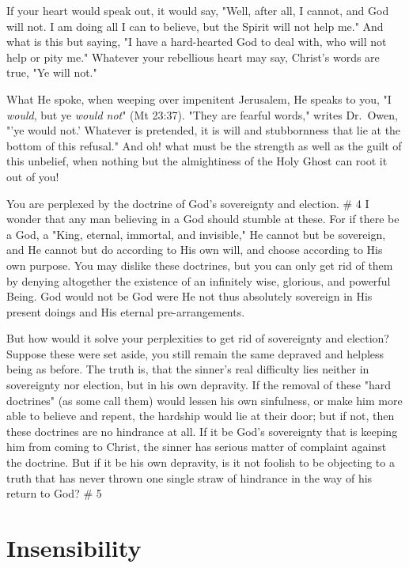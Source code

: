 \documentclass[
]{book}
\begin{document}
If your heart would speak out, it would say, "Well, after all, I cannot, and God will not. I am doing all I can to believe, but the Spirit will not help me." And what is this but saying, "I have a hard-hearted God to deal with, who will not help or pity me." Whatever your rebellious heart may say, Christ's words are true, "Ye will not."

What He spoke, when weeping over impenitent Jerusalem, He speaks to you, "I \emph{would}, but ye \emph{would not}" (Mt 23:37). "They are fearful words," writes Dr.~Owen, "'ye would not.' Whatever is pretended, it is will and stubbornness that lie at the bottom of this refusal." And oh! what must be the strength as well as the guilt of this unbelief, when nothing but the almightiness of the Holy Ghost can root it out of you!

You are perplexed by the doctrine of God's sovereignty and election.
\# 4
I wonder that any man believing in a God should stumble at these. For if there be a God, a "King, eternal, immortal, and invisible," He cannot but be sovereign, and He cannot but do according to His own will, and choose according to His own purpose. You may dislike these doctrines, but you can only get rid of them by denying altogether the existence of an infinitely wise, glorious, and powerful Being. God would not be God were He not thus absolutely sovereign in His present doings and His eternal pre-arrangements.

But how would it solve your perplexities to get rid of sovereignty and election? Suppose these were set aside, you still remain the same depraved and helpless being as before. The truth is, that the sinner's real difficulty lies neither in sovereignty nor election, but in his own depravity. If the removal of these "hard doctrines" (as some call them) would lessen his own sinfulness, or make him more able to believe and repent, the hardship would lie at their door; but if not, then these doctrines are no hindrance at all. If it be God's sovereignty that is keeping him from coming to Christ, the sinner has serious matter of complaint against the doctrine. But if it be his own depravity, is it not foolish to be objecting to a truth that has never thrown one single straw of hindrance in the way of his return to God?
\# 5

\hypertarget{insensibility}{%
\chapter{Insensibility}\label{insensibility}}
\end{document}
